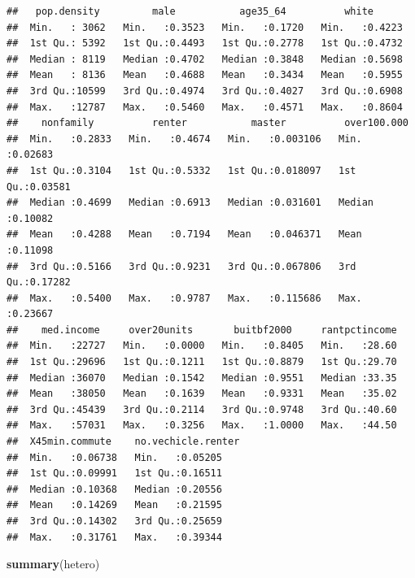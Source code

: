 \documentclass[]{article}
\newenvironment{Shaded}{\begin{snugshade}}{\end{snugshade}}
\newcommand{\KeywordTok}[1]{\textcolor[rgb]{0.13,0.29,0.53}{\textbf{#1}}}
\newcommand{\NormalTok}[1]{#1}
\begin{document}
\begin{verbatim}
##   pop.density         male           age35_64          white       
##  Min.   : 3062   Min.   :0.3523   Min.   :0.1720   Min.   :0.4223  
##  1st Qu.: 5392   1st Qu.:0.4493   1st Qu.:0.2778   1st Qu.:0.4732  
##  Median : 8119   Median :0.4702   Median :0.3848   Median :0.5698  
##  Mean   : 8136   Mean   :0.4688   Mean   :0.3434   Mean   :0.5955  
##  3rd Qu.:10599   3rd Qu.:0.4974   3rd Qu.:0.4027   3rd Qu.:0.6908  
##  Max.   :12787   Max.   :0.5460   Max.   :0.4571   Max.   :0.8604  
##    nonfamily          renter           master          over100.000     
##  Min.   :0.2833   Min.   :0.4674   Min.   :0.003106   Min.   :0.02683  
##  1st Qu.:0.3104   1st Qu.:0.5332   1st Qu.:0.018097   1st Qu.:0.03581  
##  Median :0.4699   Median :0.6913   Median :0.031601   Median :0.10082  
##  Mean   :0.4288   Mean   :0.7194   Mean   :0.046371   Mean   :0.11098  
##  3rd Qu.:0.5166   3rd Qu.:0.9231   3rd Qu.:0.067806   3rd Qu.:0.17282  
##  Max.   :0.5400   Max.   :0.9787   Max.   :0.115686   Max.   :0.23667  
##    med.income     over20units       buitbf2000     rantpctincome  
##  Min.   :22727   Min.   :0.0000   Min.   :0.8405   Min.   :28.60  
##  1st Qu.:29696   1st Qu.:0.1211   1st Qu.:0.8879   1st Qu.:29.70  
##  Median :36070   Median :0.1542   Median :0.9551   Median :33.35  
##  Mean   :38050   Mean   :0.1639   Mean   :0.9331   Mean   :35.02  
##  3rd Qu.:45439   3rd Qu.:0.2114   3rd Qu.:0.9748   3rd Qu.:40.60  
##  Max.   :57031   Max.   :0.3256   Max.   :1.0000   Max.   :44.50  
##  X45min.commute    no.vechicle.renter
##  Min.   :0.06738   Min.   :0.05205   
##  1st Qu.:0.09991   1st Qu.:0.16511   
##  Median :0.10368   Median :0.20556   
##  Mean   :0.14269   Mean   :0.21595   
##  3rd Qu.:0.14302   3rd Qu.:0.25659   
##  Max.   :0.31761   Max.   :0.39344
\end{verbatim}

\begin{Shaded}
\begin{Highlighting}[]
\KeywordTok{summary}\NormalTok{(hetero)}
\end{Highlighting}
\end{Shaded}
\end{document}
